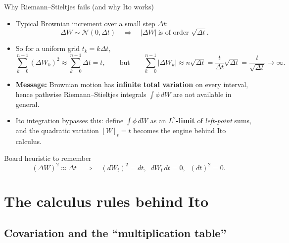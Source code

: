 \documentclass[10pt,aspectratio=169]{beamer}
\begin{document}
\begin{frame}{Why Riemann--Stieltjes fails (and why Ito works)}

\begin{itemize}
  \item Typical Brownian increment over a small step $\Delta t$:
  \[
  \Delta W \sim \mathcal{N}(0,\Delta t)\quad\Rightarrow\quad |\Delta W|\ \text{is of order }\sqrt{\Delta t}.
  \]
  \pause

  \item So for a uniform grid $t_k=k\Delta t$,
  \[
  \sum_{k=0}^{n-1}(\Delta W_k)^2 \approx \sum_{k=0}^{n-1}\Delta t = t,
  \qquad
  \text{but}
  \qquad
  \sum_{k=0}^{n-1}|\Delta W_k|
  \approx
  n\sqrt{\Delta t}
  =
  \frac{t}{\Delta t}\sqrt{\Delta t}
  =
  \frac{t}{\sqrt{\Delta t}}
  \to\infty.
  \]
  \pause

  \item \textbf{Message:} Brownian motion has \textbf{infinite total variation} on every interval,
  hence pathwise Riemann--Stieltjes integrals $\int \phi\,dW$ are not available in general.\pause

  \item Ito integration bypasses this: define $\int \phi\,dW$ as an \textbf{$L^2$-limit} of \emph{left-point} sums,
  and the quadratic variation $[W]_t=t$ becomes the engine behind Ito calculus.\pause
\end{itemize}

\begin{alertblock}{Board heuristic to remember}
\[
(\Delta W)^2 \approx \Delta t
\quad\Longrightarrow\quad
(dW_t)^2 = dt,\;\; dW_t\,dt=0,\;\; (dt)^2=0.
\]
\end{alertblock}

\end{frame}
\section{The calculus rules behind Ito}

\subsection{Covariation and the ``multiplication table''}
\end{document}
